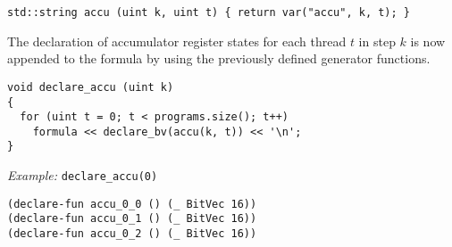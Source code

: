 \begin{lstlisting}[style=c++]
std::string accu (uint k, uint t) { return var("accu", k, t); }
\end{lstlisting}

\noindent
The declaration of accumulator register states for each thread $t$ in step $k$ is now appended to the formula by using the previously defined generator functions.

\begin{lstlisting}[style=c++]
void declare_accu (uint k)
{
  for (uint t = 0; t < programs.size(); t++)
    formula << declare_bv(accu(k, t)) << '\n';
}
\end{lstlisting}

\noindent
\emph{Example:} \lstinline[style=c++]{declare_accu(0)}

% 
\begin{lstlisting}[language=SMTLib]
(declare-fun accu_0_0 () (_ BitVec 16))
(declare-fun accu_0_1 () (_ BitVec 16))
(declare-fun accu_0_2 () (_ BitVec 16))
\end{lstlisting}

